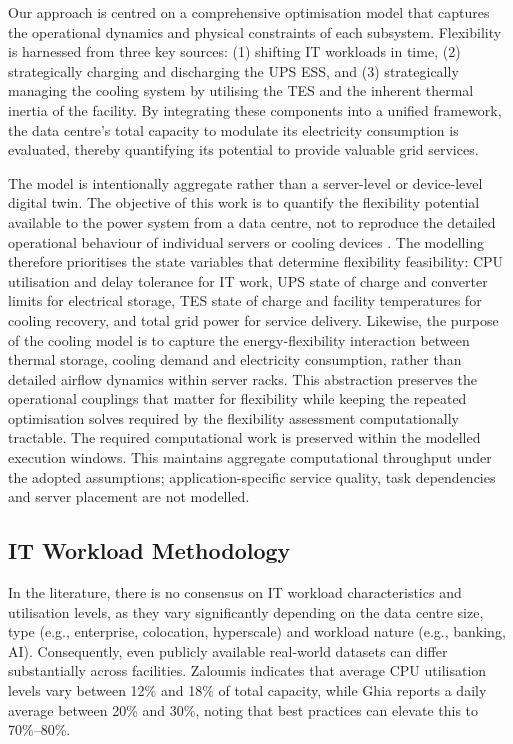 \documentclass[lettersize,journal]{IEEEtran}
\newcommand{\rev}[1]{#1}
\begin{document}
Our approach is centred on a comprehensive optimisation model that captures the operational dynamics and physical constraints of each subsystem. Flexibility is harnessed from three key sources: (1) shifting IT workloads in time, (2) strategically charging and discharging the UPS ESS, and (3) strategically managing the cooling system by utilising the TES and the inherent thermal inertia of the facility. By integrating these components into a unified framework, the data centre's total capacity to modulate its electricity consumption is evaluated, thereby quantifying its potential to provide valuable grid services.

\rev{The model is intentionally aggregate rather than a server-level or device-level digital twin. The objective of this work is to quantify the flexibility potential available to the power system from a data centre, not to reproduce the detailed operational behaviour of individual servers or cooling devices \cite{barroso2018datacenter,dayarathna2015data}. The modelling therefore prioritises the state variables that determine flexibility feasibility: CPU utilisation and delay tolerance for IT work, UPS state of charge and converter limits for electrical storage, TES state of charge and facility temperatures for cooling recovery, and total grid power for service delivery. Likewise, the purpose of the cooling model is to capture the energy-flexibility interaction between thermal storage, cooling demand and electricity consumption, rather than detailed airflow dynamics within server racks. This abstraction preserves the operational couplings that matter for flexibility while keeping the repeated optimisation solves required by the flexibility assessment computationally tractable. The required computational work is preserved within the modelled execution windows. This maintains aggregate computational throughput under the adopted assumptions; application-specific service quality, task dependencies and server placement are not modelled.}

\label{sec: methodology}
\subsection{IT Workload Methodology}\label{sec:it-workload-methodology}
 
In the literature, there is no consensus on IT workload characteristics and utilisation levels, as they vary significantly depending on the data centre size, type (e.g., enterprise, colocation, hyperscale) and workload nature (e.g., banking, AI). Consequently, even publicly available real-world datasets can differ substantially across facilities. Zaloumis \cite{Zaloumis2022IBM} indicates that average CPU utilisation levels vary between 12\% and 18\% of total capacity, while Ghia \cite{Ghia2011McKinsey} reports a daily average between 20\% and 30\%, noting that best practices can elevate this to 70\%--80\%. 
 
\end{document}

